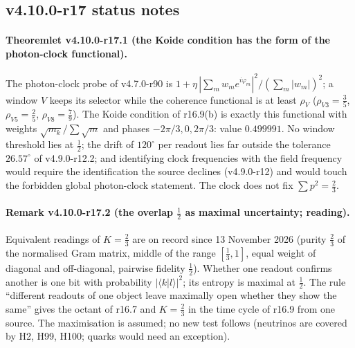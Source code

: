 \subsection*{v4.10.0-r17 status notes}
\label{subsec:v4100-r17-status}

\paragraph{Theoremlet v4.10.0-r17.1 (the Koide condition has the form of the photon-clock functional).}
The photon-clock probe of v4.7.0-r90 is \(1+\eta\,|\sum_mw_me^{i\varphi_m}|^2/(\sum_m|w_m|)^2\); a window \(V\) keeps its selector while the
coherence functional is at least \(\rho_V\) (\(\rho_{V3}=\tfrac35\), \(\rho_{V5}=\tfrac25\), \(\rho_{V8}=\tfrac79\)).  The Koide condition of r16.9(b) is exactly
this functional with weights \(\sqrt{m_k}/\sum\sqrt m\) and phases \(-2\pi/3,0,2\pi/3\): value \(0.499991\).  No window threshold lies at
\(\tfrac12\); the drift of \(120^\circ\) per readout lies far outside the tolerance \(26.57^\circ\) of v4.9.0-r12.2; and identifying clock
frequencies with the field frequency would require the identification the source declines (v4.9.0-r12) and would touch the
forbidden global photon-clock statement.  The clock does not fix \(\sum p^2=\tfrac23\).

\paragraph{Remark v4.10.0-r17.2 (the overlap \(\tfrac12\) as maximal uncertainty; reading).}
Equivalent readings of \(K=\tfrac23\) are on record since 13 November 2026 (purity \(\tfrac23\) of the normalised Gram matrix, middle of the
range \([\tfrac13,1]\), equal weight of diagonal and off-diagonal, pairwise fidelity \(\tfrac12\)).  Whether one readout confirms another is
one bit with probability \(|\langle k|l\rangle|^2\); its entropy is maximal at \(\tfrac12\).  The rule ``different readouts of one object leave
maximally open whether they show the same'' gives the octant of r16.7 and \(K=\tfrac23\) in the time cycle of r16.9 from one source.  The
maximisation is assumed; no new test follows (neutrinos are covered by H2, H99, H100; quarks would need an exception).

